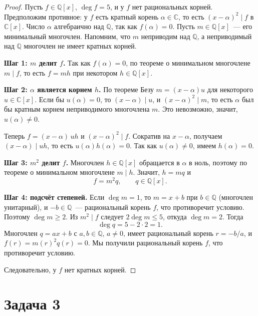 \documentclass[12pt]{article}
\begin{document}
	\begin{proof}
		Пусть $f \in \mathbb{Q}[x]$, $\deg f = 5$, и у $f$ нет рациональных корней. Предположим противное: у $f$ есть кратный корень $\alpha \in \mathbb{C}$, то есть $(x - \alpha)^2 \mid f$ в $\mathbb{C}[x]$. Число $\alpha$ алгебраично над $\mathbb{Q}$, так как $f(\alpha) = 0$. Пусть $m \in \mathbb{Q}[x]$~--- его минимальный многочлен. Напомним, что $m$ неприводим над $\mathbb{Q}$, а неприводимый над $\mathbb{Q}$ многочлен не имеет кратных корней.

		\medskip
		\noindent
		\textbf{Шаг 1: $m$ делит $f$.} Так как $f(\alpha) = 0$, по теореме о минимальном многочлене $m \mid f$, то есть $f = mh$ при некотором $h \in \mathbb{Q}[x]$.

		\medskip
		\noindent
		\textbf{Шаг 2: $\alpha$ является корнем $h$.} По теореме Безу $m = (x - \alpha)u$ для некоторого $u \in \mathbb{C}[x]$. Если бы $u(\alpha) = 0$, то $(x - \alpha) \mid u$, и $(x - \alpha)^2 \mid m$, то есть $\alpha$ был бы кратным корнем неприводимого многочлена $m$. Это невозможно, значит, $u(\alpha) \ne 0$.

		Теперь $f = (x - \alpha)\,uh$ и $(x - \alpha)^2 \mid f$. Сократив на $x - \alpha$, получаем $(x - \alpha) \mid uh$, то есть $u(\alpha)h(\alpha) = 0$. Так как $u(\alpha) \ne 0$, имеем $h(\alpha) = 0$.

		\medskip
		\noindent
		\textbf{Шаг 3: $m^2$ делит $f$.} Многочлен $h \in \mathbb{Q}[x]$ обращается в $\alpha$ в ноль, поэтому по теореме о минимальном многочлене $m \mid h$. Значит, $h = mq$ и
		\[
			f = m^2 q, \qquad q \in \mathbb{Q}[x].
		\]

		\medskip
		\noindent
		\textbf{Шаг 4: подсчёт степеней.} Если $\deg m = 1$, то $m = x + b$ при $b \in \mathbb{Q}$ (многочлен унитарный), и $-b \in \mathbb{Q}$~--- рациональный корень $f$, что противоречит условию. Поэтому $\deg m \geqslant 2$. Из $m^2 \mid f$ следует $2\deg m \leqslant 5$, откуда $\deg m = 2$. Тогда
		\[
			\deg q = 5 - 2 \cdot 2 = 1.
		\]
		Многочлен $q = ax + b$ с $a, b \in \mathbb{Q}$, $a \ne 0$, имеет рациональный корень $r = -b/a$, и $f(r) = m(r)^2 q(r) = 0$. Мы получили рациональный корень $f$, что противоречит условию.

		Следовательно, у $f$ нет кратных корней.
	\end{proof}

	\section*{Задача 3}
\end{document}
